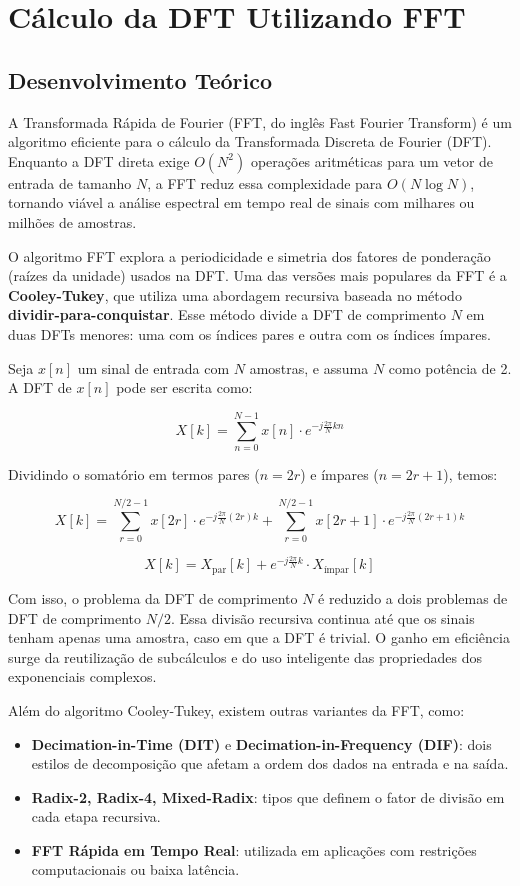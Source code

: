 \documentclass[12pt]{article}
\begin{document}
\newpage
\section{Cálculo da DFT Utilizando FFT}
\subsection{Desenvolvimento Teórico}

A Transformada Rápida de Fourier (FFT, do inglês Fast Fourier Transform) é um algoritmo eficiente para o cálculo da Transformada Discreta de Fourier (DFT). Enquanto a DFT direta exige $O(N^2)$ operações aritméticas para um vetor de entrada de tamanho $N$, a FFT reduz essa complexidade para $O(N \log N)$, tornando viável a análise espectral em tempo real de sinais com milhares ou milhões de amostras.

O algoritmo FFT explora a periodicidade e simetria dos fatores de ponderação (raízes da unidade) usados na DFT. Uma das versões mais populares da FFT é a \textbf{Cooley-Tukey}, que utiliza uma abordagem recursiva baseada no método \textbf{dividir-para-conquistar}. Esse método divide a DFT de comprimento $N$ em duas DFTs menores: uma com os índices pares e outra com os índices ímpares.

Seja $x[n]$ um sinal de entrada com $N$ amostras, e assuma $N$ como potência de 2. A DFT de $x[n]$ pode ser escrita como:

\[
X[k] = \sum_{n=0}^{N-1} x[n] \cdot e^{-j\frac{2\pi}{N}kn}
\]

Dividindo o somatório em termos pares ($n = 2r$) e ímpares ($n = 2r + 1$), temos:

\[
X[k] = \sum_{r=0}^{N/2 - 1} x[2r] \cdot e^{-j\frac{2\pi}{N}(2r)k} + \sum_{r=0}^{N/2 - 1} x[2r + 1] \cdot e^{-j\frac{2\pi}{N}(2r+1)k}
\]

\[
X[k] = X_{\text{par}}[k] + e^{-j\frac{2\pi}{N}k} \cdot X_{\text{ímpar}}[k]
\]

Com isso, o problema da DFT de comprimento $N$ é reduzido a dois problemas de DFT de comprimento $N/2$. Essa divisão recursiva continua até que os sinais tenham apenas uma amostra, caso em que a DFT é trivial. O ganho em eficiência surge da reutilização de subcálculos e do uso inteligente das propriedades dos exponenciais complexos.

Além do algoritmo Cooley-Tukey, existem outras variantes da FFT, como:
\begin{itemize}
    \item \textbf{Decimation-in-Time (DIT)} e \textbf{Decimation-in-Frequency (DIF)}: dois estilos de decomposição que afetam a ordem dos dados na entrada e na saída.
    \item \textbf{Radix-2, Radix-4, Mixed-Radix}: tipos que definem o fator de divisão em cada etapa recursiva.
    \item \textbf{FFT Rápida em Tempo Real}: utilizada em aplicações com restrições computacionais ou baixa latência.
\end{itemize}
\end{document}
